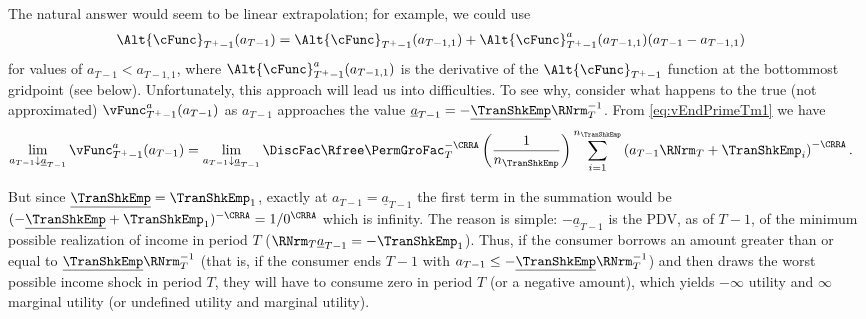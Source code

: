 \documentclass[titlepage, headings=optiontotocandhead]{\econtex}
\begin{document}
The natural answer would seem to be linear extrapolation; for example, we could use
\begin{equation}\begin{gathered}\begin{aligned}
      \Alt{\cFunc}_{T^{+}-1}({a}_{T-1})  & = \Alt{\cFunc}_{T^{+}-1}({a}_{T-1,1})+\Alt{\cFunc}_{T^{+}-1}^{{a}}({a}_{T-1,1})({a}_{T-1}-{a}_{T-1,1}) \label{eq:ExtrapLin}
    \end{aligned}\end{gathered}\end{equation}
for values of ${a}_{T-1} < {a}_{T-1,1}$, where $\Alt{\cFunc}_{T^{+}-1}^{{a}}({a}_{T-1,1})$ is the derivative of the $\Alt{\cFunc}_{T^{+}-1}$ function at the bottommost gridpoint (see below).  Unfortunately, this approach
will lead us into difficulties.  To see why, consider what
happens to the true (not approximated) $\vFunc^{{a}}_{T^{+}-1}({a}_{T-1})$ as
${a}_{T-1}$ approaches the value
$\underline{a}_{T-1}=-\underline{\TranShkEmp}\RNrm_{T}^{-1}$.  From
\eqref{eq:vEndPrimeTm1} we have
\begin{equation}\begin{gathered}\begin{aligned}
      \lim_{{a}_{T-1} \downarrow \underline{a}_{T-1}} \vFunc^{{a}}_{T^{+}-1}({a}_{T-1}) 
      & =                                                                                         \lim_{{a}_{T-1} \downarrow \underline{a}_{T-1}} \DiscFac \Rfree \PermGroFac_{T}^{-\CRRA} \left(\frac{1}{n_{\TranShkEmp}}\right) \sum_{i=1}^{n_{\TranShkEmp}} \left( {a}_{T-1} \RNrm_{T}+ \TranShkEmp_{i}\right)^{-\CRRA}.
    \end{aligned}\end{gathered}\end{equation}

\providecommand{\TranShkEmpMin}{}\renewcommand{\TranShkEmpMin}{\underline{\TranShkEmp}}
But since $\TranShkEmpMin=\TranShkEmp_{1}$, exactly at
${a}_{T-1}=\underline{a}_{T-1}$ the first term in the summation would
be $(-\TranShkEmpMin+\TranShkEmp_{1})^{-\CRRA}=1/0^{\CRRA}$ which is
infinity.  The reason is simple: $-\underline{a}_{T-1}$ is
the PDV, as of $T-1$, of the minimum possible realization of income in
period $T$ ($\RNrm_{T}\underline{a}_{T-1} = -\TranShkEmp_{1}$).  Thus,
if the consumer borrows an amount greater than or equal to
$\underline{\TranShkEmp}\RNrm_{T}^{-1}$ (that is, if the consumer ends
$T-1$ with ${a}_{T-1} \leq -\underline{\TranShkEmp}\RNrm_{T}^{-1}$) and
then draws the worst possible income shock in period $T$, they will have
to consume zero in period $T$ (or a negative amount), which yields
$-\infty$ utility and $\infty$ marginal utility (or undefined utility
and marginal utility).
\end{document}
